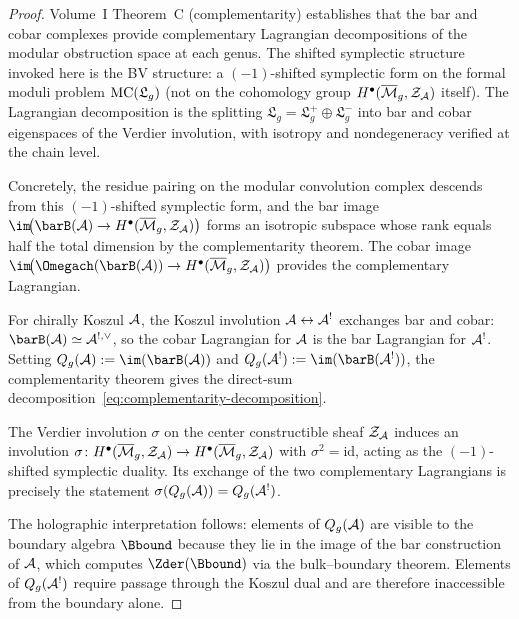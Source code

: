 \begin{proof}
Volume~I Theorem~C (complementarity) establishes that the bar
and cobar complexes provide complementary Lagrangian
decompositions of the modular obstruction space at each genus.
The shifted symplectic structure invoked here is the BV
structure: a $(-1)$-shifted symplectic form on the formal moduli
problem $\operatorname{MC}(\mathfrak{L}_g)$ (not on the cohomology group
$H^\bullet(\overline{\mathcal{M}}_g,\mathcal{Z}_{\mathcal{A}})$ itself). The Lagrangian
decomposition is the splitting
$\mathfrak{L}_g = \mathfrak{L}_g^+ \oplus \mathfrak{L}_g^-$ into bar and cobar eigenspaces
of the Verdier involution, with isotropy and nondegeneracy
verified at the chain level.

Concretely, the residue pairing on the modular convolution
complex descends from this $(-1)$-shifted symplectic form, and
the bar image
$\im\!\bigl(\barB(\cA)\to H^\bullet(\Mbar_g,\cZ_\cA)\bigr)$
forms an isotropic subspace whose rank equals half the total
dimension by the complementarity theorem. The cobar image
$\im\!\bigl(\Omegach(\barB(\cA))\to H^\bullet(\Mbar_g,\cZ_\cA)\bigr)$
provides the complementary Lagrangian.

For chirally Koszul $\mathcal{A}$, the Koszul involution $\mathcal{A}\leftrightarrow\mathcal{A}^!$
exchanges bar and cobar:
$\barB(\cA)\simeq\cA^{!,\vee}$, so the
cobar Lagrangian for $\mathcal{A}$ is the bar Lagrangian for $\mathcal{A}^!$.
Setting $Q_g(\cA):=\im(\barB(\cA))$ and
$Q_g(\cA^!):=\im(\barB(\cA^!))$, the complementarity theorem
gives the direct-sum decomposition~\eqref{eq:complementarity-decomposition}.

The Verdier involution $\sigma$ on the center constructible sheaf
$\mathcal{Z}_{\mathcal{A}}$ induces an involution
$\sigma\colon H^\bullet(\overline{\mathcal{M}}_g,\mathcal{Z}_{\mathcal{A}})\to H^\bullet(\overline{\mathcal{M}}_g,\mathcal{Z}_{\mathcal{A}})$
with $\sigma^2=\mathrm{id}$, acting as the $(-1)$-shifted symplectic
duality. Its exchange of the two
complementary Lagrangians is precisely the statement
$\sigma(Q_g(\mathcal{A}))=Q_g(\mathcal{A}^!)$.

The holographic interpretation follows: elements of $Q_g(\mathcal{A})$
are visible to the boundary algebra $\Bbound$ because they
lie in the image of the bar construction of $\mathcal{A}$, which
computes $\Zder(\Bbound)$ via the bulk--boundary
theorem. Elements of $Q_g(\mathcal{A}^!)$ require passage through
the Koszul dual and are therefore inaccessible from the
boundary alone.
\end{proof}

